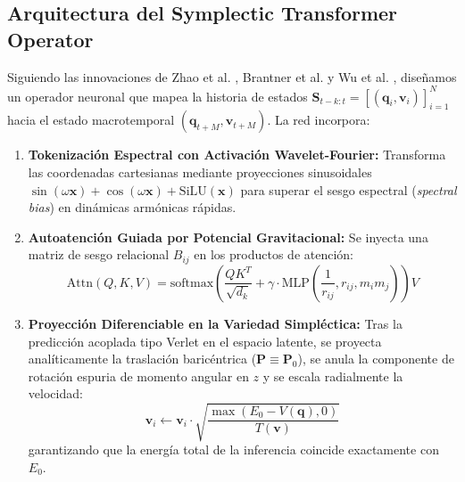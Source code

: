\documentclass[11pt,a4paper]{article}
\begin{document}
\subsection{Arquitectura del Symplectic Transformer Operator}
Siguiendo las innovaciones de Zhao et al. \cite{zhao2023pinnsformer}, Brantner et al. \cite{brantner2024structure} y Wu et al. \cite{wu2024transolver}, diseñamos un operador neuronal que mapea la historia de estados $\mathbf{S}_{t-k:t} = [(\mathbf{q}_i, \mathbf{v}_i)]_{i=1}^N$ hacia el estado macrotemporal $(\mathbf{q}_{t+M}, \mathbf{v}_{t+M})$. La red incorpora:
\begin{enumerate}
    \item \textbf{Tokenización Espectral con Activación Wavelet-Fourier:} Transforma las coordenadas cartesianas mediante proyecciones sinusoidales $\sin(\omega \mathbf{x}) + \cos(\omega \mathbf{x}) + \text{SiLU}(\mathbf{x})$ para superar el sesgo espectral (\textit{spectral bias}) en dinámicas armónicas rápidas.
    \item \textbf{Autoatención Guiada por Potencial Gravitacional:} Se inyecta una matriz de sesgo relacional $B_{ij}$ en los productos de atención:
    \begin{equation}
        \text{Attn}(Q, K, V) = \text{softmax}\left(\frac{QK^T}{\sqrt{d_k}} + \gamma \cdot \text{MLP}\left(\frac{1}{r_{ij}}, r_{ij}, m_i m_j\right)\right)V
    \end{equation}
    \item \textbf{Proyección Diferenciable en la Variedad Simpléctica:} Tras la predicción acoplada tipo Verlet en el espacio latente, se proyecta analíticamente la traslación baricéntrica ($\mathbf{P} \equiv \mathbf{P}_0$), se anula la componente de rotación espuria de momento angular en $z$ y se escala radialmente la velocidad:
    \begin{equation}
        \mathbf{v}_i \leftarrow \mathbf{v}_i \cdot \sqrt{\frac{\max(E_0 - V(\mathbf{q}), 0)}{T(\mathbf{v})}}
    \end{equation}
    garantizando que la energía total de la inferencia coincide exactamente con $E_0$.
\end{enumerate}
\end{document}
